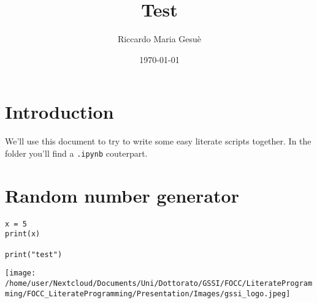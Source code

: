 \documentclass[11pt]{article}
\author{Riccardo Maria Gesuè}
\date{\today}
\title{Test}
\begin{document}
\maketitle
\tableofcontents

\section{Introduction}
\label{sec:orgb715f95}
We'll use this document to try to write some easy literate scripts together.
In the folder you'll find a \texttt{.ipynb} couterpart.
\section{Random number generator}
\label{sec:org2588615}
\begin{verbatim}
x = 5
print(x)

print("test")
\end{verbatim}

\begin{center}
\texttt{[image: /home/user/Nextcloud/Documents/Uni/Dottorato/GSSI/FOCC/LiterateProgramming/FOCC\_LiterateProgramming/Presentation/Images/gssi\_logo.jpeg]}
\end{center}
\end{document}
